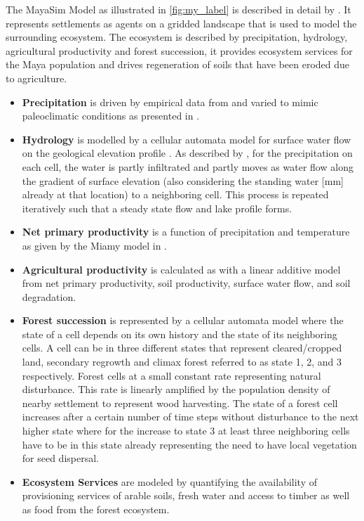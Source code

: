 The MayaSim Model as illustrated in \cref{fig:my_label} is described in detail by \cite{Heckbert2013}. It represents settlements as agents on a gridded landscape that is used to model the surrounding ecosystem. The ecosystem is described by precipitation, hydrology, agricultural productivity and forest succession, it provides ecosystem services for the Maya population and drives regeneration of soils that have been eroded due to agriculture.

\begin{itemize}
    \item \textbf{Precipitation} is driven by empirical data from \cite{Hijmans2005} and varied to mimic paleoclimatic conditions as presented in \cite{Prufer2011}.
    \item \textbf{Hydrology} is modelled by a cellular automata model for surface water flow on the geological elevation profile \citep{Farr2000}. As described by \cite{Reaney2008}, for the precipitation on each cell, the water is partly infiltrated and partly moves as water flow along the gradient of surface elevation (also considering the standing water [mm] already at that location) to a neighboring cell. This process is repeated iteratively such that a steady state flow and lake profile forms. 
    \item \textbf{Net primary productivity} is a function of precipitation and temperature as given by the Miamy model in \cite{Lieth1975}.
    \item \textbf{Agricultural productivity} is calculated as with a linear additive model from net primary productivity, soil productivity, surface water flow, and soil degradation.
    \item \textbf{Forest succession} is represented by a cellular automata model where the state of a cell depends on its own history and the state of its neighboring cells. A cell can be in three different states that represent cleared/cropped land, secondary regrowth and climax forest referred to as state 1, 2, and 3 respectively. Forest cells at a small constant rate representing natural disturbance. This rate is linearly amplified by the population density of nearby settlement to represent wood harvesting. The state of a forest cell increases after a certain number of time steps without disturbance to the next higher state where for the increase to state 3 at least three neighboring cells have to be in this state already representing the need to have local vegetation for seed dispersal.
	\item \textbf{Ecosystem Services} are modeled by quantifying the availability of provisioning services of arable soils, fresh water and access to timber as well as food from the forest ecosystem.
\end{itemize}

